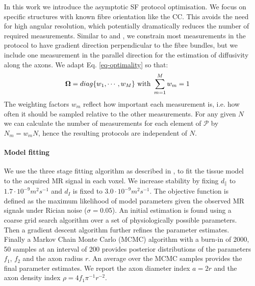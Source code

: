In this work we introduce the asymptotic SF protocol optimisation. We focus on specific structures with known fibre orientation like the CC. This avoids the need for high angular resolution, which potentially dramatically reduces the number of required measurements. Similar to \citet{Assaf:2008} and \citet{Barazany:2009}, we constrain most measurements in the protocol to have gradient direction perpendicular to the fibre bundles, but we include one measurement in the parallel direction for the estimation of diffusivity along the axons. We adapt Eq. \ref{eq-optimality} so that: 
\begin{equation}
	\mathbf{\Omega}=diag\{w_1,\cdots,w_M\} \mbox{ with } \sum_{m=1}^{M}w_m=1
\end{equation}
The weighting factors $w_m$ reflect how important each measurement is, i.e. how often it should be sampled relative to the other measurements. For any given $N$ we can calculate the number of measurements for each element of $\mathcal{P}$ by $N_{m}=w_mN$, hence the resulting protocols are independent of $N$.
\paragraph{Model fitting}
We use the three stage fitting algorithm as described in \citet{Alexander:2010}, to fit the tissue model to the acquired MR signal in each voxel. We increase stability by fixing $d_\parallel$ to $1.7\cdot 10^{-9} m^2s^{-1}$ and $d_I$ is fixed to $3.0\cdot 10^{-9} m^2s^{-1}$\citep{Assaf:2008,Barazany:2009,Alexander:2010}. The objective function is defined as the maximum likelihood of model parameters given the observed MR signals under Rician noise ($\sigma=0.05$). An initial estimation is found using a coarse grid search algorithm over a set of physiologically possible parameters. Then a gradient descent algorithm further refines the parameter estimates. Finally a Markov Chain Monte Carlo (MCMC) algorithm with a burn-in of 2000, 50 samples at an interval of 200 provides posterior distributions of the parameters $f_1$, $f_2$ and the axon radius $r$. An average over the MCMC samples provides the final parameter estimates. We report the axon diameter index $a=2r$ and the axon density index $\rho=4f_1\pi^{-1}r^{-2}$.

